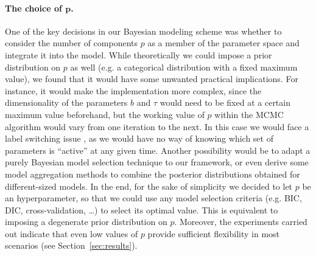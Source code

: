 \paragraph{The choice of \(\symbf p\).} One of the key decisions in our Bayesian modeling scheme was whether to consider the number of components \(p\) as a member of the parameter space and integrate it into the model. While theoretically we could impose a prior distribution on \(p\) as well (e.g. a categorical distribution with a fixed maximum value), we found that it would have some unwanted practical implications. For instance, it would make the implementation more complex, since the dimensionality of the parameters \(b\) and \(\tau\) would need to be fixed at a certain maximum value beforehand, but the working value of \(p\) within the MCMC algorithm would vary from one iteration to the next. In this case we would face a label switching issue \citep[c.f.][Sec.~2.3]{grollemund2019bayesian}, as we would have no way of knowing which set of parameters is ``active'' at any given time. Another possibility would be to adapt a purely Bayesian model selection technique \citep[e.g.][Ch.~7]{piironen2017comparison, gelman2013bayesian} to our framework, or even derive some model aggregation methods to combine the posterior distributions obtained for different-sized models. In the end, for the sake of simplicity we decided to let \(p\) be an hyperparameter, so that we could use any model selection criteria (e.g. BIC, DIC, cross-validation, \ldots) to select its optimal value. This is equivalent to imposing a degenerate prior distribution on \(p\). Moreover, the experiments carried out indicate that even low values of \(p\) provide sufficient flexibility in most scenarios (see Section~\ref{sec:results}). 

